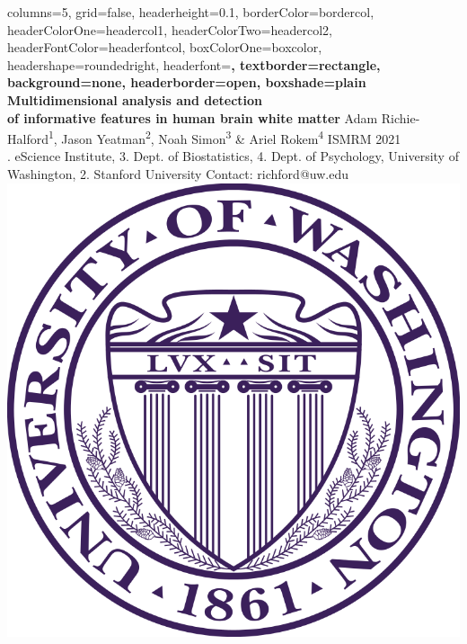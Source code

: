 \documentclass[a0paper,landscape,fontscale=0.395]{baposter}
\begin{document}
\begin{poster}{
    columns=5,
    grid=false,
    headerheight=0.1\textheight,
    borderColor=bordercol, %
    headerColorOne=headercol1, %
    headerColorTwo=headercol2, %
    headerFontColor=headerfontcol, %
    boxColorOne=boxcolor, %
    headershape=roundedright, %
    headerfont=\Large\sf\bf, %
    textborder=rectangle,
    background=none,
    headerborder=open, %
    boxshade=plain
}
{}
%
%
{\sf\bf Multidimensional analysis and detection \\ of informative features in human brain white matter} %
{\vspace{0.5em} Adam Richie-Halford\textsuperscript{1}, Jason Yeatman\textsuperscript{2}, Noah Simon\textsuperscript{3} \& Ariel Rokem\textsuperscript{4} \hfill ISMRM 2021\hspace{0.5em}\null \\ %
{. eScience Institute, 3. Dept. of Biostatistics, 4. Dept. of Psychology, University of Washington, 2. Stanford University \hfill Contact: richford@uw.edu \hspace{0.5em}\null}} %
{\includegraphics[scale=0.12]{UWlogo.png}} %
\vspace{-10em}


\end{poster}
\end{document}
